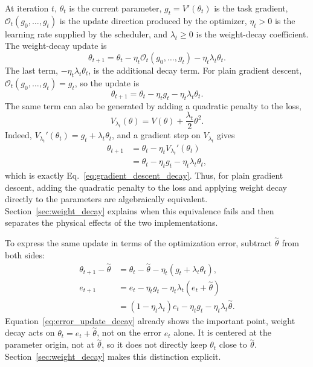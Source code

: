 \documentclass[11pt,letterpaper]{article}
\begin{document}
At iteration $t$, $\theta_t$ is the current parameter,
$g_t=V'(\theta_t)$ is the task gradient, $\mathcal O_t(g_0,\ldots,g_t)$ is
the update direction produced by the optimizer, $\eta_t>0$ is the learning
rate supplied by the scheduler, and $\lambda_t\geq0$ is the weight-decay
coefficient.
The weight-decay update is
\begin{equation}\label{eq:optimizer_scheduler_decay}
  \theta_{t+1}
  =\theta_t
   -\eta_t\mathcal O_t(g_0,\ldots,g_t)
   -\eta_t\lambda_t\theta_t.
\end{equation}
The last term, $-\eta_t\lambda_t\theta_t$, is the additional decay term. For
plain gradient descent, $\mathcal O_t(g_0,\ldots,g_t)=g_t$, so the update is
\begin{equation}\label{eq:gradient_descent_decay}
  \theta_{t+1}
  =\theta_t-\eta_tg_t-\eta_t\lambda_t\theta_t.
\end{equation}
The same term can also be generated by adding a quadratic penalty to the loss,
\begin{equation}\label{eq:regularized_potential}
  V_{\lambda_t}(\theta)
  =V(\theta)+\frac{\lambda_t}{2}\theta^2.
\end{equation}
Indeed, $V_{\lambda_t}'(\theta_t)=g_t+\lambda_t\theta_t$, and a gradient
step on $V_{\lambda_t}$ gives
\begin{align}
  \theta_{t+1}
  &=\theta_t-\eta_tV_{\lambda_t}'(\theta_t)\\
  &=\theta_t-\eta_tg_t-\eta_t\lambda_t\theta_t,
\end{align}
which is exactly Eq.~\eqref{eq:gradient_descent_decay}. Thus, for plain
gradient descent, adding the quadratic penalty to the loss and applying
weight decay directly to the parameters are algebraically equivalent.
Section~\ref{sec:weight_decay} explains when this equivalence fails and then
separates the physical effects of the two implementations.

To express the same update in terms of the optimization error, subtract
$\overset{\sim}{\theta}$ from both sides:
\begin{equation}\label{eq:error_update_decay}
  \begin{aligned}
    \theta_{t+1}-\overset{\sim}{\theta}
    &=\theta_t-\overset{\sim}{\theta}-\eta_t(g_t+\lambda_t\theta_t),\\
    e_{t+1}
    &=e_t-\eta_tg_t-\eta_t\lambda_t(e_t+\overset{\sim}{\theta})\\
    &=(1-\eta_t\lambda_t)e_t-\eta_tg_t
      -\eta_t\lambda_t\overset{\sim}{\theta}.
  \end{aligned}
\end{equation}
Equation~\eqref{eq:error_update_decay} already shows the important point,
weight decay acts on \(\theta_t=e_t+\overset{\sim}{\theta}\), not on the error \(e_t\)
alone. It is centered at the parameter origin, not at
\(\overset{\sim}{\theta}\), so it does not directly keep \(\theta_t\) close to
\(\overset{\sim}{\theta}\). Section~\ref{sec:weight_decay} makes this distinction
explicit.
\end{document}
